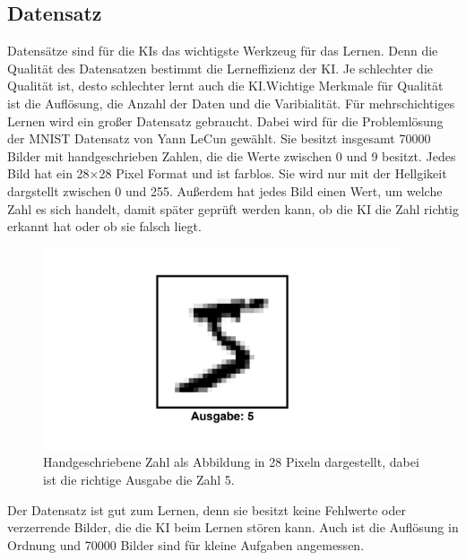 \documentclass[11pt]{article}
\begin{document}
\subsection{Datensatz}
Datensätze sind für die KIs das wichtigste Werkzeug für das Lernen. Denn die Qualität des Datensatzen bestimmt die Lerneffizienz der KI.\@
Je schlechter die Qualität ist, desto schlechter lernt auch die KI.\@ Wichtige Merkmale für Qualität ist die Auflösung, die Anzahl der Daten und die Varibialität.
Für mehrschichtiges Lernen wird ein großer Datensatz gebraucht. Dabei wird für die Problemlösung der MNIST Datensatz von Yann LeCun gewählt.
Sie besitzt insgesamt 70000 Bilder mit handgeschrieben Zahlen, die die Werte zwischen 0 und 9 besitzt. Jedes Bild hat ein 28$\times$28 Pixel
Format und ist farblos. Sie wird nur mit der Hellgikeit dargstellt zwischen 0 und 255. Außerdem hat jedes Bild einen Wert, um welche Zahl
es sich handelt, damit später geprüft werden kann, ob die KI die Zahl richtig erkannt hat oder ob sie falsch liegt.
\begin{figure}[h]
    \centering
    \includegraphics[width=300pt, keepaspectratio]{images/number}
    \caption[Handgeschriebene Zahl 5]{Handgeschriebene Zahl als Abbildung in 28 Pixeln dargestellt, dabei ist die richtige Ausgabe die Zahl 5.}
\end{figure}
Der Datensatz ist gut zum Lernen, denn sie besitzt keine Fehlwerte oder verzerrende Bilder, die die KI beim Lernen stören kann. Auch ist die
Auflösung in Ordnung und 70000 Bilder sind für kleine Aufgaben angemessen.
\end{document}
